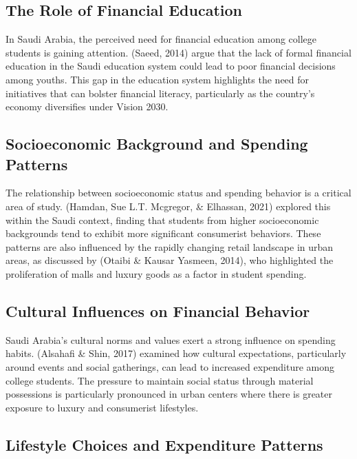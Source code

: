 \documentclass[
]{article}
\begin{document}
\hypertarget{the-role-of-financial-education}{%
\subsection{The Role of Financial
Education}\label{the-role-of-financial-education}}

In Saudi Arabia, the perceived need for financial education among
college students is gaining attention. (Saeed, 2014) argue that the lack
of formal financial education in the Saudi education system could lead
to poor financial decisions among youths. This gap in the education
system highlights the need for initiatives that can bolster financial
literacy, particularly as the country's economy diversifies under Vision
2030.

\hypertarget{socioeconomic-background-and-spending-patterns}{%
\subsection{Socioeconomic Background and Spending
Patterns}\label{socioeconomic-background-and-spending-patterns}}

The relationship between socioeconomic status and spending behavior is a
critical area of study. (Hamdan, Sue L.T. Mcgregor, \& Elhassan, 2021)
explored this within the Saudi context, finding that students from
higher socioeconomic backgrounds tend to exhibit more significant
consumerist behaviors. These patterns are also influenced by the rapidly
changing retail landscape in urban areas, as discussed by (Otaibi \&
Kausar Yasmeen, 2014), who highlighted the proliferation of malls and
luxury goods as a factor in student spending.

\hypertarget{cultural-influences-on-financial-behavior}{%
\subsection{Cultural Influences on Financial
Behavior}\label{cultural-influences-on-financial-behavior}}

Saudi Arabia's cultural norms and values exert a strong influence on
spending habits. (Alsahafi \& Shin, 2017) examined how cultural
expectations, particularly around events and social gatherings, can lead
to increased expenditure among college students. The pressure to
maintain social status through material possessions is particularly
pronounced in urban centers where there is greater exposure to luxury
and consumerist lifestyles.

\hypertarget{lifestyle-choices-and-expenditure-patterns}{%
\subsection{Lifestyle Choices and Expenditure
Patterns}\label{lifestyle-choices-and-expenditure-patterns}}
\end{document}
